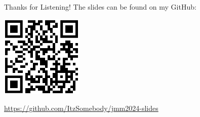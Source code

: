 \begin{frame}{Thanks for Listening!}
    The slides can be found on my GitHub:
    \begin{center}
        \includegraphics[scale=1]{figures/github_qr.png}
        
        \url{https://github.com/ItzSomebody/jmm2024-slides}
    \end{center}
\end{frame}